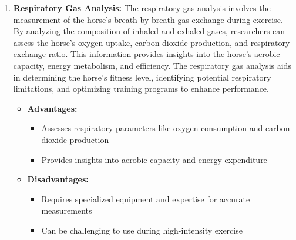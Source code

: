 \begin{enumerate}
\item \textbf{Respiratory Gas Analysis:} The respiratory gas analysis involves the measurement of the horse's breath-by-breath gas exchange during exercise. By analyzing the composition of inhaled and exhaled gases, researchers can assess the horse's oxygen uptake, carbon dioxide production, and respiratory exchange ratio. This information provides insights into the horse's aerobic capacity, energy metabolism, and efficiency. The respiratory gas analysis aids in determining the horse's fitness level, identifying potential respiratory limitations, and optimizing training programs to enhance performance.
\begin{itemize}
\item[] \textbf{\small Advantages:}
\begin{itemize}
\item Assesses respiratory parameters like oxygen consumption and carbon dioxide production
\item Provides insights into aerobic capacity and energy expenditure
\end{itemize}
\item[] \textbf{\small Disadvantages:}
\begin{itemize}
\item Requires specialized equipment and expertise for accurate measurements
\item Can be challenging to use during high-intensity exercise
\end{itemize}
\end{itemize}


\end{enumerate}
